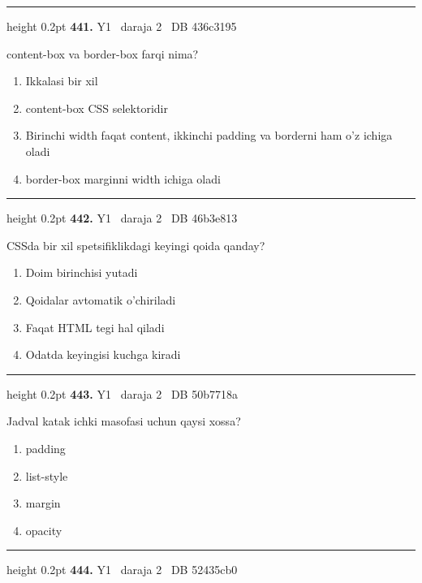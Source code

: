 \documentclass[10pt,a4paper,oneside]{article}
\begin{document}
\vspace{2mm}\hrule height 0.2pt \vspace{4mm}
\hypertarget{q441}{\textbf{\color{ink}441.}}  {\color{muted}\scriptsize Y1 \textbullet\ daraja 2 \textbullet\ DB 436c3195}
\par
content-box va border-box farqi nima?
\begin{enumerate}[label=\Alph*),leftmargin=9mm]
\item Ikkalasi bir xil
\item content-box CSS selektoridir
\item Birinchi width faqat content, ikkinchi padding va borderni ham o'z ichiga oladi
\item border-box marginni width ichiga oladi
\end{enumerate}
\vspace{2mm}\hrule height 0.2pt \vspace{4mm}
\hypertarget{q442}{\textbf{\color{ink}442.}}  {\color{muted}\scriptsize Y1 \textbullet\ daraja 2 \textbullet\ DB 46b3e813}
\par
CSSda bir xil spetsifiklikdagi keyingi qoida qanday?
\begin{enumerate}[label=\Alph*),leftmargin=9mm]
\item Doim birinchisi yutadi
\item Qoidalar avtomatik o'chiriladi
\item Faqat HTML tegi hal qiladi
\item Odatda keyingisi kuchga kiradi
\end{enumerate}
\vspace{2mm}\hrule height 0.2pt \vspace{4mm}
\hypertarget{q443}{\textbf{\color{ink}443.}}  {\color{muted}\scriptsize Y1 \textbullet\ daraja 2 \textbullet\ DB 50b7718a}
\par
Jadval katak ichki masofasi uchun qaysi xossa?
\begin{enumerate}[label=\Alph*),leftmargin=9mm]
\item padding
\item list-style
\item margin
\item opacity
\end{enumerate}
\vspace{2mm}\hrule height 0.2pt \vspace{4mm}
\hypertarget{q444}{\textbf{\color{ink}444.}}  {\color{muted}\scriptsize Y1 \textbullet\ daraja 2 \textbullet\ DB 52435cb0}
\end{document}
